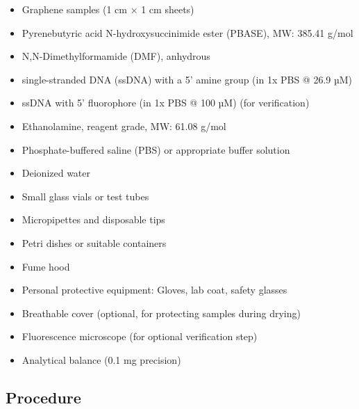 \documentclass[11pt]{article}
\begin{document}
\begin{itemize}
    \item Graphene samples (1 cm $\times$ 1 cm sheets)
    \item Pyrenebutyric acid N-hydroxysuccinimide ester (PBASE), MW: 385.41 g/mol
    \item N,N-Dimethylformamide (DMF), anhydrous
    \item single-stranded DNA (ssDNA) with a 5' amine group (in 1x PBS @ 26.9 µM)
    \item ssDNA with 5' fluorophore (in 1x PBS @ 100 µM) (for verification)
    \item Ethanolamine, reagent grade, MW: 61.08 g/mol
    \item Phosphate-buffered saline (PBS) or appropriate buffer solution
    \item Deionized water
    \item Small glass vials or test tubes
    \item Micropipettes and disposable tips
    \item Petri dishes or suitable containers
    \item Fume hood
    \item Personal protective equipment: Gloves, lab coat, safety glasses
    \item Breathable cover (optional, for protecting samples during drying)
    \item Fluorescence microscope (for optional verification step)
    \item Analytical balance (0.1 mg precision)
\end{itemize}

\subsection*{Procedure}
\end{document}
